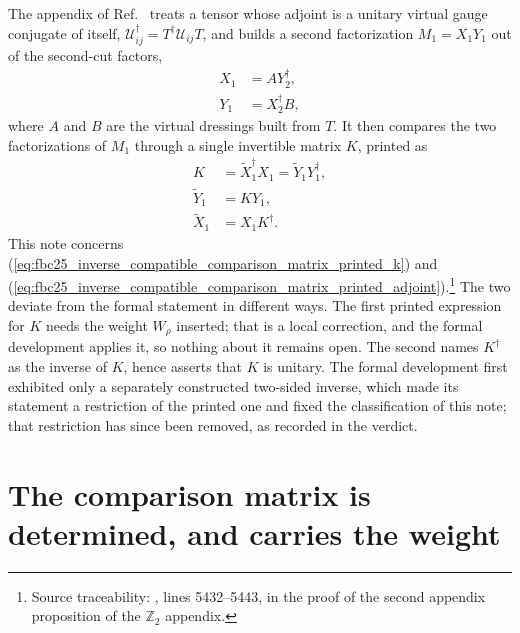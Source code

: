 \documentclass{article}
\begin{document}
The appendix of Ref.~\cite{FrancoRubio2025MPUGauging} treats a tensor whose
adjoint is a unitary virtual gauge conjugate of itself,
$\mathcal U^\dagger_{ij}=T^\dagger\mathcal U_{ij}T$, and builds a second
factorization $M_1=X_1Y_1$ out of the second-cut factors,
\begin{align}
    X_1
     & =A Y_2^\dagger,
    \label{eq:fbc25_inverse_compatible_comparison_matrix_candidate_x} \\
    Y_1
     & =X_2^\dagger B,
    \label{eq:fbc25_inverse_compatible_comparison_matrix_candidate_y}
\end{align}
where $A$ and $B$ are the virtual dressings built from $T$. It then compares
the two factorizations of $M_1$ through a single invertible matrix $K$, printed
as
\begin{align}
    K
     & =\tilde X_1^\dagger X_1
    =\tilde Y_1Y_1^\dagger,
    \label{eq:fbc25_inverse_compatible_comparison_matrix_printed_k} \\
    \tilde Y_1
     & =KY_1,
    \label{eq:fbc25_inverse_compatible_comparison_matrix_printed_pairing} \\
    \tilde X_1
     & =X_1K^\dagger.
    \label{eq:fbc25_inverse_compatible_comparison_matrix_printed_adjoint}
\end{align}
This note concerns
(\ref{eq:fbc25_inverse_compatible_comparison_matrix_printed_k}) and
(\ref{eq:fbc25_inverse_compatible_comparison_matrix_printed_adjoint}).\footnote{Source
    traceability: , lines 5432--5443, in the
    proof of the second appendix proposition of the $\mathbb Z_2$ appendix.}
The two deviate from the formal statement in different ways. The first printed
expression for $K$ needs the weight $W_\rho$ inserted; that is a local
correction, and the formal development applies it, so nothing about it remains
open. The second names $K^\dagger$ as the inverse of $K$, hence asserts that
$K$ is unitary. The formal development first exhibited only a separately
constructed two-sided inverse, which made its statement a restriction of the
printed one and fixed the classification of this note; that restriction has
since been removed, as recorded in the verdict.

\section{The comparison matrix is determined, and carries the weight}
\end{document}
